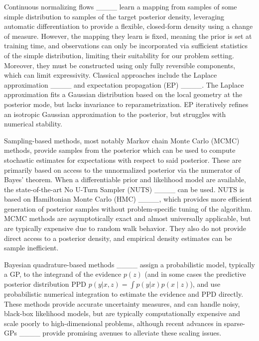 Continuous normalizing flows ____ learn a mapping from samples of some simple distribution to samples of the target posterior density, leveraging automatic differentiation to provide a flexible, closed-form density using a change of measure. However, the mapping they learn is fixed, meaning the prior is set at training time, and observations can only be incorporated via sufficient statistics of the simple distribution, limiting their suitability for our problem setting. Moreover, they must be constructed using only fully reversible components, which can limit expressivity. Classical approaches include the Laplace approximation ____ and expectation propagation (EP) ____. The Laplace approximation fits a Gaussian distribution based on the local geometry at the posterior mode, but lacks invariance to reparametrization. EP iteratively refines an isotropic Gaussian approximation to the posterior, but struggles with numerical stability.

Sampling-based methods, most notably Markov chain Monte Carlo (MCMC) methods, provide samples from the posterior which can be used to compute stochastic estimates for expectations with respect to said posterior. These are primarily based on access to the unnormalized posterior via the numerator of Bayes' theorem. When a differentiable prior and likelihood model are available, the state-of-the-art No U-Turn Sampler (NUTS) ____ can be used. NUTS is based on Hamiltonian Monte Carlo (HMC) ____, which provides more efficient generation of posterior samples without problem-specific tuning of the algorithm. MCMC methods are asymptotically exact and almost universally applicable, but are typically expensive due to random walk behavior. They also do not provide direct access to a posterior density, and empirical density estimates can be  sample inefficient.

Bayesian quadrature-based methods ____ assign a probabilistic model, typically a GP, to the integrand of the evidence $p(z)$ (and in some cases the predictive posterior distribution PPD $p(y|x,z)=\int p(y|x)p(x \mathop{|} z)$), and use probabilistic numerical integration to estimate the evidence and PPD directly. These methods provide accurate uncertainty measures, and can handle noisy, black-box likelihood models, but are typically computationally expensive and scale poorly to high-dimensional problems, although recent advances in sparse-GPs ____ provide promising avenues to alleviate these scaling issues.

